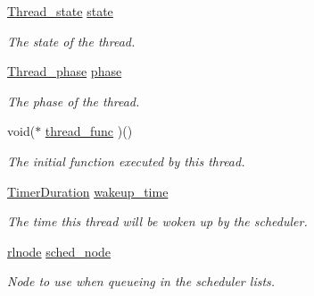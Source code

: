 \begin{DoxyCompactItemize}
\mbox{\label{structthread__control__block_affd872365cf4768fa1c9bd1e196bb97c}} 
\hyperlink{group__scheduler_ga6c969c169777f82c104cf73e501df70f}{Thread\+\_\+state} \hyperlink{structthread__control__block_affd872365cf4768fa1c9bd1e196bb97c}{state}
\begin{DoxyCompactList}\small\item\em The state of the thread. \end{DoxyCompactList}\item 
\mbox{\label{structthread__control__block_aa7e8e6a00c5f9f25210a49589ad818f8}} 
\hyperlink{group__scheduler_gab180b4aa356776bddcd724cef4f5deae}{Thread\+\_\+phase} \hyperlink{structthread__control__block_aa7e8e6a00c5f9f25210a49589ad818f8}{phase}
\begin{DoxyCompactList}\small\item\em The phase of the thread. \end{DoxyCompactList}\item 
\mbox{\label{structthread__control__block_a91a73f2ad3f727b7412b912b3d65109a}} 
void($\ast$ \hyperlink{structthread__control__block_a91a73f2ad3f727b7412b912b3d65109a}{thread\+\_\+func} )()
\begin{DoxyCompactList}\small\item\em The initial function executed by this thread. \end{DoxyCompactList}\item 
\mbox{\label{structthread__control__block_a7dbf9ba7df67911abb7951e249f587b6}} 
\hyperlink{bios_8h_ae7291e5cd742fb9bc6d4aaa0d51bd0ee}{Timer\+Duration} \hyperlink{structthread__control__block_a7dbf9ba7df67911abb7951e249f587b6}{wakeup\+\_\+time}
\begin{DoxyCompactList}\small\item\em The time this thread will be woken up by the scheduler. \end{DoxyCompactList}\item 
\mbox{\label{structthread__control__block_add433b079e04053fe70fdd2b92e1d6ad}} 
\hyperlink{group__rlists_ga8f6244877f7ce2322c90525217ea6e7a}{rlnode} \hyperlink{structthread__control__block_add433b079e04053fe70fdd2b92e1d6ad}{sched\+\_\+node}
\begin{DoxyCompactList}\small\item\em Node to use when queueing in the scheduler lists. \end{DoxyCompactList}\item 

\end{DoxyCompactItemize}
